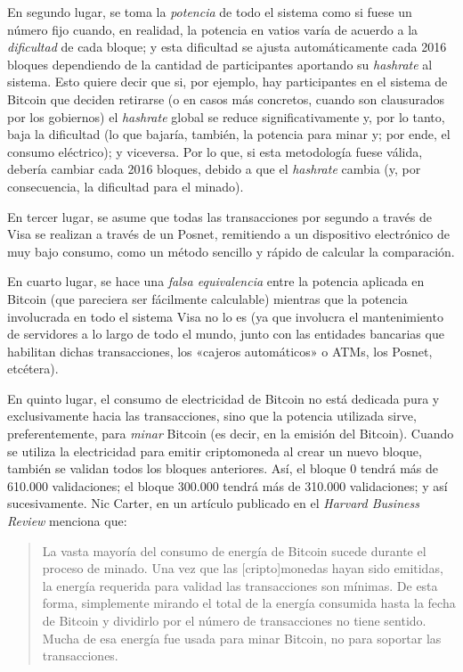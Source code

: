 \documentclass[12pt,a4paper,twoside]{book}
\begin{document}
En segundo lugar, se toma la \textit{potencia} de todo el sistema como si fuese un número fijo cuando, en realidad, la potencia en vatios varía de acuerdo a la \textit{dificultad} de cada bloque; y esta dificultad se ajusta automáticamente cada 2016 bloques dependiendo de la cantidad de participantes aportando su \textit{hashrate} al sistema. Esto quiere decir que si, por ejemplo, hay participantes en el sistema de Bitcoin que deciden retirarse (o en casos más concretos, cuando son clausurados por los gobiernos) el \textit{hashrate} global se reduce significativamente y, por lo tanto, baja la dificultad (lo que bajaría, también, la potencia para minar y; por ende, el consumo eléctrico); y viceversa. Por lo que, si esta metodología fuese válida, debería cambiar cada 2016 bloques, debido a que el \textit{hashrate} cambia (y, por consecuencia, la dificultad para el minado).

En tercer lugar, se asume que todas las transacciones por segundo a través de Visa se realizan a través de un Posnet, remitiendo a un dispositivo electrónico de muy bajo consumo, como un método sencillo y rápido de calcular la comparación.

En cuarto lugar, se hace una \textit{falsa equivalencia} entre la potencia aplicada en Bitcoin (que pareciera ser fácilmente calculable) mientras que la potencia involucrada en todo el sistema Visa no lo es (ya que involucra el mantenimiento de servidores a lo largo de todo el mundo, junto con las entidades bancarias que habilitan dichas transacciones, los «cajeros automáticos» o ATMs, los Posnet, etcétera).

En quinto lugar, el consumo de electricidad de Bitcoin no está dedicada pura y exclusivamente hacia las transacciones, sino que la potencia utilizada sirve, preferentemente, para \textit{minar} Bitcoin (es decir, en la emisión del Bitcoin). Cuando se utiliza la electricidad para emitir criptomoneda al crear un nuevo bloque, también se validan todos los bloques anteriores. Así, el bloque 0 tendrá más de 610.000 validaciones; el bloque 300.000 tendrá más de 310.000 validaciones; y así sucesivamente. Nic Carter, en un artículo publicado en el \textit{Harvard Business Review} menciona que:

\begin{quotation}
La vasta mayoría del consumo de energía de Bitcoin sucede durante el proceso de minado. Una vez que las [cripto]monedas hayan sido emitidas, la energía requerida para validad las transacciones son mínimas. De esta forma, simplemente mirando el total de la energía consumida hasta la fecha de Bitcoin y dividirlo por el número de transacciones no tiene sentido. Mucha de esa energía fue usada para minar Bitcoin, no para soportar las transacciones. \cite{bitcoin:transaccion}
\end{quotation}
\end{document}
